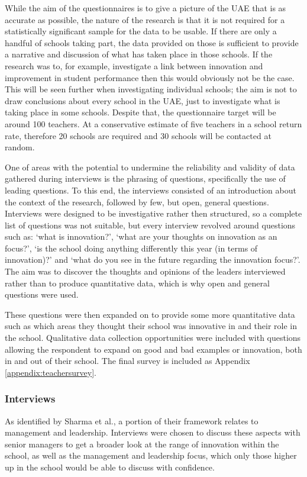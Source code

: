 \documentclass[11pt]{article}
\begin{document}
While the aim of the questionnaires is to give a picture of the UAE that is as accurate as possible, the nature of the research is that it is not required for a statistically significant sample for the data to be usable. If there are only a handful of schools taking part, the data provided on those is sufficient to provide a narrative and discussion of what has taken place in those schools. If the research was to, for example, investigate a link between innovation and improvement in student performance then this would obviously not be the case. This will be seen further when investigating individual schools; the aim is not to draw conclusions about every school in the UAE, just to investigate what is taking place in some schools.
Despite that, the questionnaire target will be around 100 teachers. At a conservative estimate of five teachers in a school return rate, therefore 20 schools are required and 30 schools will be contacted at random.

One of areas with the potential to undermine the reliability and validity of data gathered during interviews is the phrasing of questions, specifically the use of leading questions. To this end, the interviews consisted of an introduction about the context of the research, followed by few, but open, general questions. Interviews were designed to be investigative rather then structured, so a complete list of questions was not suitable, but every interview revolved around questions such as: `what is innovation?', `what are your thoughts on innovation as an focus?', `is the school doing anything differently this year (in terms of innovation)?' and `what do you see in the future regarding the innovation focus?'. The aim was to discover the thoughts and opinions of the leaders interviewed rather than to produce quantitative data, which is why open and general questions were used. 

These questions were then expanded on to provide some more quantitative data such as which areas they thought their school was innovative in and their role in the school. Qualitative data collection opportunities were included with questions allowing the respondent to expand on good and bad examples or innovation, both in and out of their school.
The final survey is included as Appendix \ref{appendix:teachersurvey}.

\subsubsection{Interviews}
As identified by Sharma et al., a portion of their framework relates to management and leadership. Interviews were chosen to discuss these aspects with senior managers to get a broader look at the range of innovation within the school, as well as the management and leadership focus, which only those higher up in the school would be able to discuss with confidence.
\end{document}
